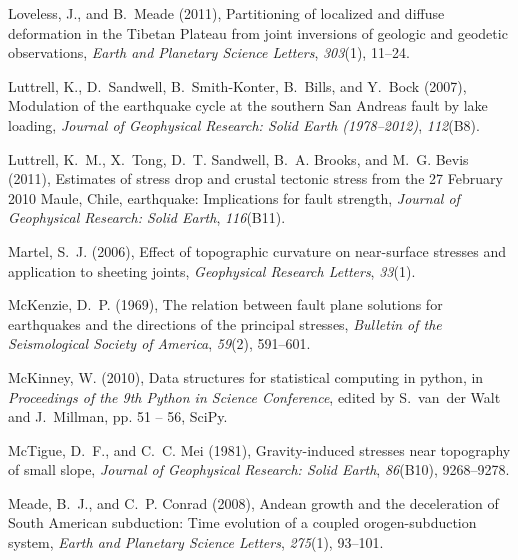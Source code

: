 \documentclass[twocolumn,jgrga]{AGUTeX}
\begin{document}
\begin{article}
{{{\begin{thebibliography}{89}
Loveless, J., and B.~Meade (2011), Partitioning of localized and diffuse
  deformation in the {T}ibetan {P}lateau from joint inversions of geologic and
  geodetic observations, \textit{Earth and Planetary Science Letters},
  \textit{303}(1), 11--24.

Luttrell, K., D.~Sandwell, B.~Smith-Konter, B.~Bills, and Y.~Bock (2007),
  Modulation of the earthquake cycle at the southern {S}an {A}ndreas fault by
  lake loading, \textit{Journal of Geophysical Research: Solid Earth
  (1978--2012)}, \textit{112}(B8).

Luttrell, K.~M., X.~Tong, D.~T. Sandwell, B.~A. Brooks, and M.~G. Bevis (2011),
  Estimates of stress drop and crustal tectonic stress from the 27 {F}ebruary
  2010 {M}aule, {C}hile, earthquake: Implications for fault strength,
  \textit{Journal of Geophysical Research: Solid Earth}, \textit{116}(B11).

Martel, S.~J. (2006), Effect of topographic curvature on near-surface stresses
  and application to sheeting joints, \textit{Geophysical Research Letters},
  \textit{33}(1).

McKenzie, D.~P. (1969), The relation between fault plane solutions for
  earthquakes and the directions of the principal stresses, \textit{Bulletin of
  the Seismological Society of America}, \textit{59}(2), 591--601.

McKinney, W. (2010), Data structures for statistical computing in python, in
  \textit{Proceedings of the 9th Python in Science Conference}, edited by
  S.~van~der Walt and J.~Millman, pp. 51 -- 56, SciPy.

McTigue, D.~F., and C.~C. Mei (1981), Gravity-induced stresses near topography
  of small slope, \textit{Journal of Geophysical Research: Solid Earth},
  \textit{86}(B10), 9268--9278.

Meade, B.~J., and C.~P. Conrad (2008), Andean growth and the deceleration of
  {S}outh {A}merican subduction: {T}ime evolution of a coupled
  orogen-subduction system, \textit{Earth and Planetary Science Letters},
  \textit{275}(1), 93--101.


\end{thebibliography}}}}
\end{article}
\end{document}
